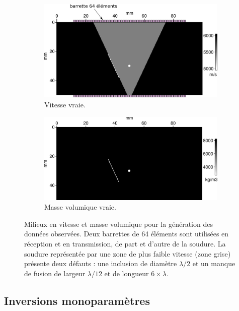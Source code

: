 \begin{figure}[!h]
	\centering
	\begin{subfigure}[b]{0.45\textwidth}
		\includegraphics[width=\textwidth]{img/milieux_ps/vp_true.png}
		\caption{Vitesse vraie.}
	\end{subfigure}
	\begin{subfigure}[b]{0.45\textwidth}
		\includegraphics[width=\textwidth]{img/milieux_ps/rho_true.png}
		\caption{Masse volumique vraie.}
	\end{subfigure}
	\caption{Milieux en vitesse et masse volumique pour la génération des données observées. Deux barrettes de 64 éléments sont utilisées en réception et en transmission, de part et d'autre de la soudure. La soudure représentée par une zone de plus faible vitesse (zone grise) présente deux défauts : une inclusion de diamètre $\lambda/2$ et un manque de fusion de largeur $\lambda/12$ et de longueur $6\times \lambda$.\label{app:iso:model}}
\end{figure}




\subsection{Inversions monoparamètres}

